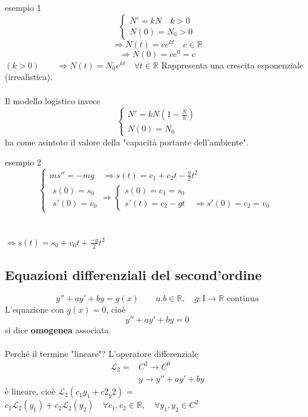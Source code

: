 \documentclass[x11names]{article}
\begin{document}
	\begin{es}{esempio 1}
	\[
		\begin{cases}
			N' = kN  \quad k>0 \\
			N(0) = N_0  > 0 
		\end{cases} 
	\]
	\[
	\Longrightarrow N(t)  = ce^{kt} \quad c \in \mathbb{R} 
	\]
	\[
	\Longrightarrow N(0) = ce^0 = c
	\]
	$(k>0) \qquad \Longrightarrow N(t) = N_0 e^{kt} \quad \forall t \in \mathbb{R}$
	Rappresenta una crescita esponenziale (irrealistica). \\ \\
	
	\noindent
	Il modello logistico invece
	\[
	\begin{cases}
		N' = kN(1 - \frac{N}{h}) \\
		N(0) = N_0
	\end{cases}
	\]
	ha come asintoto il valore della "capacità portante dell'ambiente".
	\end{es}
	\begin{es}{esempio 2}
	\[
	\begin{cases}
		ms'' = -mg \quad \Longrightarrow s(t) = c_1 + c_2t - \frac{g}{2}t^2 \\
		\begin{array}{c}
		s(0) = s_0 \\
		s'(0) = v_0
		\end{array} 
		\Longrightarrow \begin{cases}
							s(0) = c_1 = s_0 \\
							s'(t) = c_2 -gt \quad \Longrightarrow s'(0) = c_2 = v_0
						\end{cases}
	\end{cases} 
	\]
	\\ \\
	$\Longrightarrow s(t) = s_0 + v_0t + \frac{-g}{2}t^2$
	\end{es}
	
	\subsection{Equazioni differenziali del second'ordine}
	\[
	y'' + ay' + by = g(x) \qquad a.b \in \mathbb{R}, \quad g:\text{I} \to \mathbb{R} \text{ continua}
	\]
	L'equazione con $g(x) = 0$, cioè
	\[
	y'' + ay' + by = 0
	\]
	si dice \textbf{omogenea} associata. \\ \\
	
	\noindent
	Perché il termine "lineare"? L'operatore differenziale
	\begin{align*}
		\mathcal{L}_2 =& C^2 \to C^0 \\
		& y \to y'' + ay' + by
	\end{align*}
	è lineare, cioè $\mathcal{L}_2 (c_1y_1 + c2_y2)$ = $c_1 \mathcal{L}_2(y_1) + c_2 \mathcal{L}_2(y_2) \quad \forall c_1, c_2 \in \mathbb{R}, \quad \forall y_1,y_2 \in C^2$ \\ \\
	
\end{document}
